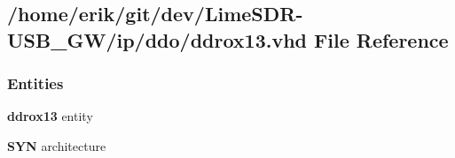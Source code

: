 \subsection{/home/erik/git/dev/\+Lime\+S\+D\+R-\/\+U\+S\+B\+\_\+\+G\+W/ip/ddo/ddrox13.vhd File Reference}
\label{ddrox13_8vhd}
\subsubsection*{Entities}
\begin{DoxyCompactItemize}
\item 
{\bf ddrox13} entity
\item 
{\bf S\+YN} architecture
\end{DoxyCompactItemize}
